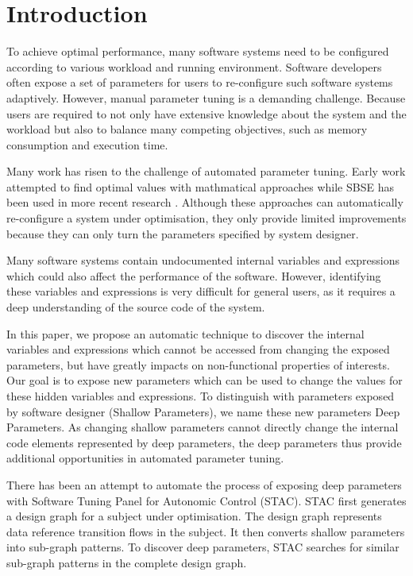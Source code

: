 
\section{Introduction}

To achieve optimal performance, many software systems need to be configured according to various workload and running environment. 
Software developers often expose a set of parameters for users to re-configure such software systems adaptively.
However, manual parameter tuning is a demanding challenge. Because users are required to not only have extensive knowledge about the system and the workload but also to balance many competing objectives, such as memory consumption and execution time.

Many work has risen to the challenge of automated parameter tuning\cite{Hoffmann:2011:DKR:1961296.1950390}. Early work attempted to find optimal values with mathmatical approaches \cite{Vuduc01statisticalmodels,autotuning,Whaley:1998:ATL:509058.509096,Tapus:2002:AHT:762761.762771} while SBSE\cite{Harman:2007:CSF:1253532.1254729} has been used in more recent research \cite{hutter2009paramils,arcuri-ssbse-2011,Hoffmann:2011:DKR:1961296.1950390}. Although these approaches can automatically re-configure a system under optimisation, they only provide limited improvements because they can only turn the parameters specified by system designer.

Many software systems contain undocumented internal variables and expressions which could also affect the performance of the software. However, identifying these variables and expressions is very difficult for general users, as it requires a deep understanding of the source code of the system. 

In this paper, we propose an automatic technique to discover the internal variables and expressions which cannot be accessed from changing the exposed parameters, but have greatly impacts on non-functional properties of interests. Our goal is to expose new parameters which can be used to change the values for these hidden variables and expressions. To distinguish with parameters exposed by software designer (Shallow Parameters), we name these new parameters Deep Parameters. As changing shallow parameters cannot directly change the internal code elements represented by deep parameters, the deep parameters thus provide additional opportunities in automated parameter tuning.

There has been an attempt to automate the process of exposing deep parameters with Software Tuning Panel for Autonomic Control (STAC)\cite{Brake:2008:ADS:1370018.1370031}. STAC first generates a design graph for a subject under optimisation. The design graph represents data reference transition flows in the subject. It then converts shallow parameters into sub-graph patterns. To discover deep parameters, STAC searches for similar sub-graph patterns in the complete design graph. 

